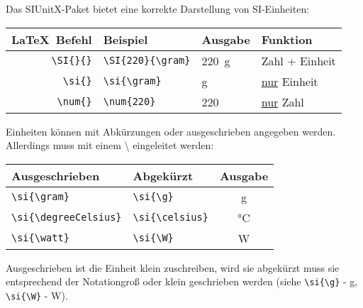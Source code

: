 \begin{frame}[fragile]
		Das SIUnitX-Paket bietet eine korrekte Darstellung von SI-Einheiten:
	\begin{center}
	\begin{tabular}{r|ll|l}
		\toprule
		\LaTeX\ Befehl					& Beispiel		&Ausgabe	&	Funktion								\\ \midrule
		\lstinline|\SI{}{}|			&	\lstinline|\SI{220}{\gram}| & \SI{220}{\gram}			&	Zahl + Einheit				\\
		\lstinline/\si{}/			&	\lstinline|\si{\gram}|	& \si{\gram}				&	\underline{nur} Einheit					\\
			\lstinline/\num{}/			&	\lstinline|\num{220}|& \num{220}					&	\underline{nur} Zahl					\\
		\bottomrule
	\end{tabular}
\end{center}
Einheiten können mit Abkürzungen oder ausgeschrieben angegeben werden. Allerdings muss mit einem {\textbackslash} eingeleitet werden:
	\begin{center}
	\begin{tabular}{ll|c}
	\toprule
	Ausgeschrieben						& Abgekürzt						& Ausgabe				\\ \midrule
	\lstinline/\si{\gram}/				&	\lstinline|\si{\g}|			& \si{\gram}			\\
	\lstinline/\si{\degreeCelsius}/		&	\lstinline|\si{\celsius}|	& \si{\celsius}		\\
	\lstinline/\si{\watt}/				&	\lstinline|\si{\W}|			& \si{\W}			\\
	\bottomrule
\end{tabular}
\end{center}
Ausgeschrieben ist die Einheit klein zuschreiben, wird sie abgekürzt muss sie entsprechend der Notationgroß oder klein geschrieben werden (siehe \lstinline|\si{\g}| - \si{\g}, \lstinline|\si{\W}| - \si{\W}).
\end{frame}



